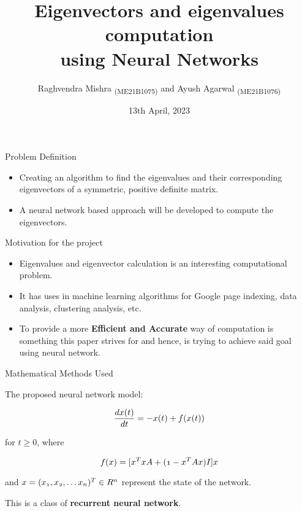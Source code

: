 \documentclass[13.5pt, aspectratio=169]{beamer}
\title{Eigenvectors and eigenvalues computation \\ using Neural Networks}
\author{\small Raghvendra Mishra \textsubscript{(ME21B1075)} and Ayush Agarwal \textsubscript{(ME21B1076)}}
\date{13th April, 2023}
\begin{document}
\maketitle

\begin{frame}{Problem Definition}
    \begin{itemize}
        \item<1-> Creating an algorithm to find the eigenvalues and their corresponding eigenvectors of a symmetric, positive definite matrix.
        \item<2-> A neural network based approach will be developed to compute the eigenvectors.
    \end{itemize}


\end{frame}

\begin{frame}{Motivation for the project}
    \begin{itemize}
        \item<1->[] Eigenvalues and eigenvector calculation is an interesting computational problem.
        \item<2->[] It has uses in machine learning algorithms for Google page indexing, data analysis, clustering analysis, etc.
        \item<3->[] To provide a more \textbf{Efficient and Accurate}  way of computation is something this paper strives for and hence, is trying to achieve said goal using neural network.
    \end{itemize}


\end{frame}

\begin{frame}{Mathematical Methods Used}

    The proposed neural network model:

    \[ \mathnormal{\frac{dx(t)}{dt} = -x(t) + f(x(t))} \]

    for $t \ge 0$, where

    \[\mathnormal{f(x) = [x^T{x}{A} + (1 - x^T{A}{x})I]x} \]

    and $ \mathnormal{x = (x_1, x_2, \ldots x_n)^{T}} \in R^{n}$ represent the state of the network.

    This is a class of \large \textbf{recurrent neural network}.

\end{frame}
\end{document}
